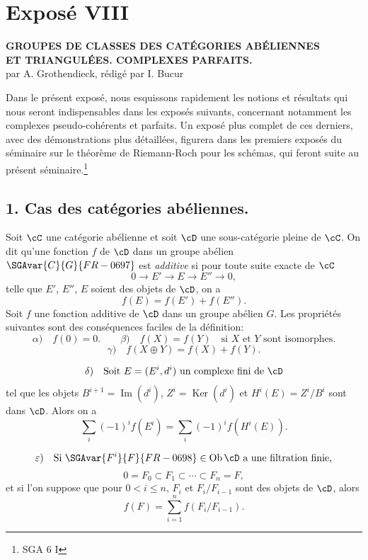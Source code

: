 \newpage
\section*{Exposé VIII}
\renewcommand{\Ob}{\operatorname{Ob}}

\begin{center}
\textbf{GROUPES DE CLASSES DES CATÉGORIES ABÉLIENNES}\\
\textbf{ET TRIANGULÉES. COMPLEXES PARFAITS.}\\[1ex]
par A. Grothendieck, rédigé par I. Bucur
\end{center}

Dans le présent exposé, nous esquissons rapidement les notions et résultats qui nous seront indispensables dans les exposés suivants, concernant notamment les complexes pseudo-cohérents et parfaits. Un exposé plus complet de ces derniers, avec des démonstrations plus détaillées, figurera dans les premiers exposés du séminaire sur le théorème de Riemann-Roch pour les schémas, qui feront suite au présent séminaire.\footnote{SGA 6 I}

\subsection*{1. Cas des catégories abéliennes.}

Soit $\cC$ une catégorie abélienne et soit $\cD$ une sous-catégorie pleine de $\cC$. On dit qu'une fonction $f$ de $\cD$ dans un groupe abélien $\SGAvar{C}{G}{FR-0697}$ est \emph{additive} si pour toute suite exacte de $\cC$
\[
0\longrightarrow E'\longrightarrow E\longrightarrow E''\longrightarrow 0,
\]
telle que $E'$, $E''$, $E$ soient des objets de $\cD$, on a
\[
f(E)=f(E')+f(E'').
\]
Soit $f$ une fonction additive de $\cD$ dans un groupe abélien $G$. Les propriétés suivantes sont des conséquences faciles de la définition:
\[
\alpha)\quad f(0)=0.\qquad
\beta)\quad f(X)=f(Y)\quad\text{si }X\text{ et }Y\text{ sont isomorphes.}
\]
\[
\gamma)\quad f(X\oplus Y)=f(X)+f(Y).
\]

\[
\delta)\quad
\text{Soit }E=(E^i,d^i)\text{ un complexe fini de }\cD
\]
tel que les objets $B^{i+1}=\operatorname{Im}(d^i)$, $Z^i=\operatorname{Ker}(d^i)$ et $H^i(E)=Z^i/B^i$ sont dans $\cD$. Alors on a
\[
\sum_i (-1)^i f(E^i)=\sum_i (-1)^i f(H^i(E)).
\]

\[
\varepsilon)\quad
\text{Si }\SGAvar{F^i}{F}{FR-0698}\in\Ob \cD\text{ a une filtration finie,}
\]
\[
0=F_0\subset F_1\subset\cdots\subset F_n=F,
\]
et si l'on suppose que pour $0<i\le n$, $F_i$ et $F_i/F_{i-1}$ sont des objets de $\cD$, alors
\[
f(F)=\sum_{i=1}^n f(F_i/F_{i-1}).
\]

